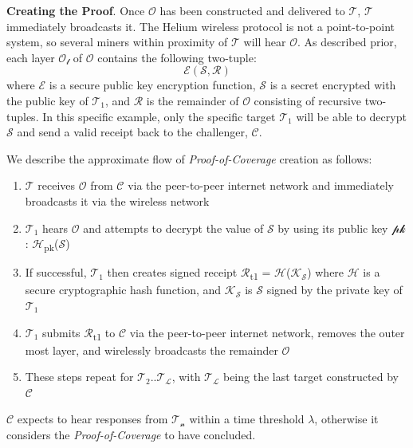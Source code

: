 \documentclass[letterpaper,11pt]{article}
\def\proofofcoverage/{\textit{Proof-of-Coverage}}
\begin{document}
\textbf{Creating the Proof}. Once $\mathcal{O}$ has been constructed and delivered to $\mathcal{T}$, $\mathcal{T}$ immediately broadcasts it. The Helium wireless protocol is not a point-to-point system, so several miners within proximity of $\mathcal{T}$ will hear $\mathcal{O}$. As described prior, each layer $\mathcal{O_l}$ of $\mathcal{O}$ contains the following two-tuple: $$\mathcal{E}(\mathcal{S}, \mathcal{R})$$ where $\mathcal{E}$ is a secure public key encryption function, $\mathcal{S}$ is a secret encrypted with the public key of $\mathcal{T_1}$, and $\mathcal{R}$ is the remainder of $\mathcal{O}$ consisting of recursive two-tuples. In this specific example, only the specific target $\mathcal{T_1}$ will be able to decrypt $\mathcal{S}$ and send a valid receipt back to the challenger, $\mathcal{C}$.\newline

We describe the approximate flow of \proofofcoverage/ creation as follows:

\begin{enumerate}
  \item $\mathcal{T}$ receives $\mathcal{O}$ from $\mathcal{C}$ via the peer-to-peer internet network and immediately broadcasts it via the wireless network
  \item $\mathcal{T_1}$ hears $\mathcal{O}$ and attempts to decrypt the value of $\mathcal{S}$ by using its public key $\mathcal{pk}$: $\mathcal{H}$\textsubscript{pk}($\mathcal{S}$)
  \item If successful, $\mathcal{T_1}$ then creates signed receipt $\mathcal{R}$\textsubscript{t1} = $\mathcal{H}$($\mathcal{K_S}$) where $\mathcal{H}$ is a secure cryptographic hash function, and $\mathcal{K_S}$ is $\mathcal{S}$ signed by the private key of $\mathcal{T_1}$
  \item $\mathcal{T_1}$ submits $\mathcal{R}$\textsubscript{t1} to $\mathcal{C}$ via the peer-to-peer internet network, removes the outer most layer, and wirelessly broadcasts the remainder $\mathcal{O}$
  \item These steps repeat for $\mathcal{T_2}$..$\mathcal{T_L}$, with $\mathcal{T_L}$ being the last target constructed by $\mathcal{C}$
\end{enumerate}

$\mathcal{C}$ expects to hear responses from $\mathcal{T_n}$ within a time threshold $\mathcal{\lambda}$, otherwise it considers the \proofofcoverage/ to have concluded.\newline
\end{document}
